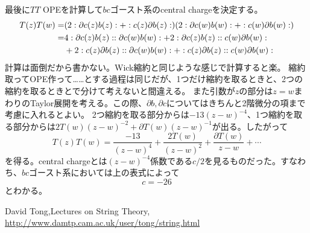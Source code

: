 \documentclass[10pt]{jsarticle}
\newcommand{\del}{{\partial}} %
\begin{document}
最後に$TT$ OPEを計算して$bc$ゴースト系のcentral chargeを決定する。
\begin{align}
  T(z)T(w)=& (2:\del c(z)b(z):+:c(z)\del b(z):)(2:\del c(w)b(w):+:c(w)\del b(w):)\\
  =&  4:\del c(z)b(z)::\del c(w) b(w):+2:\del c(z)b(z)::c(w)\del b(w):\notag \\
  &+ 2:c(z)\del b(z)::\del c(w)b(w): + :c(z)\del b(z)::c(w)\del b(w):
\end{align}
計算は面倒だから書かない。Wick縮約と同じような感じで計算すると楽。
縮約取ってOPE作って……とする過程は同じだが、1つだけ縮約を取るときと、2つの縮約を取るときとで分けて考えないと間違える。
また引数が$z$の部分は$z=w$まわりのTaylor展開を考える。この際、$\del b, \del c$についてはきちんと2階微分の項まで考慮に入れるとよい。
2つ縮約を取る部分からは$ -13(z-w)^{-4} $、1つ縮約を取る部分からは$ 2T(w)(z-w)^{-2}+\del T(w)(z-w)^{-1} $が出る。したがって
\begin{equation}
  T(z)T(w)=\frac{-13}{(z-w)^{4}}+\frac{2T(w)}{(z-w)^2}+\frac{\del T(w)}{z-w}+\cdots 
\end{equation}
を得る。central chargeとは$(z-w)^{-4}$係数である$c/2$を見るものだった。すなわち、$bc$ゴースト系においては上の表式によって
\begin{equation}
  c=-26
\end{equation}
とわかる。
\begin{thebibliography}{99}
   David Tong,Lectures on String Theory,
  \url{http://www.damtp.cam.ac.uk/user/tong/string.html}
\end{thebibliography}
\end{document}
